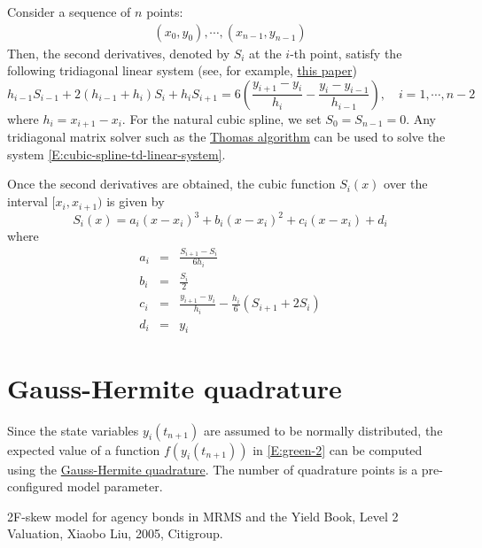 \documentclass{texyise}
\begin{document}
Consider a sequence of $n$ points:
\begin{eqnarray}
    (x_0, y_0), \cdots, (x_{n-1}, y_{n-1}) 
\end{eqnarray}
Then, the second derivatives, denoted by $S_i$ at the $i$-th point, satisfy the following tridiagonal linear system (see, for example, 
\href{https://charles-oneill.com/projects/cubicspline.pdf}{this paper})
\begin{equation}
    h_{i-1}S_{i-1} + 2(h_{i-1} + h_i)S_i + h_iS_{i+1} = 6\left(\frac{y_{i+1} - y_i}{h_i} - \frac{y_i - y_{i-1}}{h_{i-1}}\right), \quad i = 1, \cdots, n-2
    \label{E:cubic-spline-td-linear-system}
\end{equation}
where $h_i = x_{i+1} - x_{i}$. For the natural cubic spline, we set $S_0 = S_{n-1} = 0$.
Any tridiagonal matrix solver such as the \href{https://en.wikipedia.org/wiki/Tridiagonal_matrix_algorithm}{Thomas algorithm} can be used to solve the system \eqref{E:cubic-spline-td-linear-system}.

Once the second derivatives are obtained, the cubic function $S_i(x)$ over the interval $[x_{i}, x_{i+1})$ is given by
\begin{equation}
    S_i(x) = a_i(x - x_i)^3 + b_i(x - x_i)^2 + c_i(x - x_i) + d_i
\end{equation}
where
\begin{eqnarray}
    a_i & = & \frac{S_{i+1} - S_i}{6h_i} \\
    b_i & = & \frac{S_i}{2} \\
    c_i & = & \frac{y_{i+1} - y_i}{h_i} - \frac{h_i}{6}(S_{i+1} + 2S_i) \\
    d_i & = & y_i
\end{eqnarray}

\section{Gauss-Hermite quadrature}

Since the state variables $y_i(t_{n+1})$ are assumed to be normally distributed, the expected value of a function $f(y_i(t_{n+1}))$ in \eqref{E:green-2} can be computed using the \href{https://en.wikipedia.org/wiki/Gauss%E2%80%93Hermite_quadrature}{Gauss-Hermite quadrature}. The number of quadrature points is a pre-configured model parameter. 

\begin{thebibliography}{}
    
     2F-skew model for agency bonds in MRMS and the Yield Book, Level 2 Valuation, Xiaobo Liu, 2005, Citigroup.


\end{thebibliography}
\end{document}
